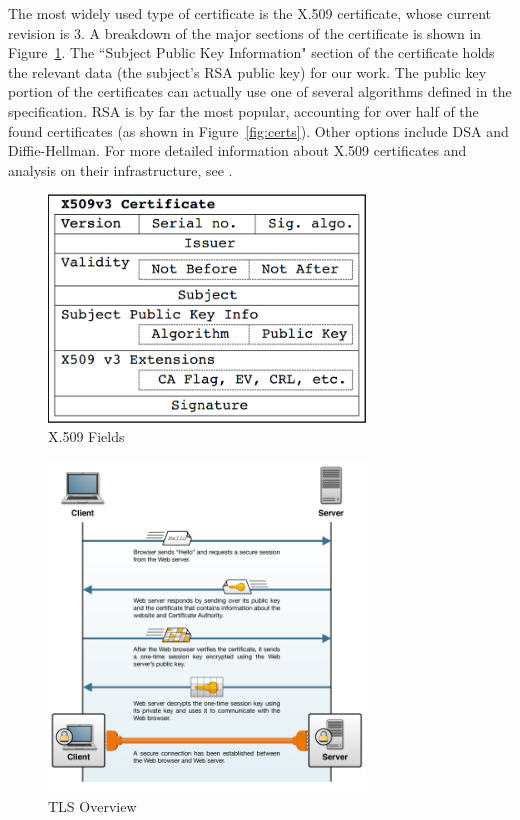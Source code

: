 \documentclass[12pt]{ucthesis}
\begin{document}
The most widely used type of certificate is the X.509 certificate, whose current
revision is 3. A breakdown of the major sections of the certificate is shown in
Figure~\ref{fig:x509}. The ``Subject Public Key Information" section of the
certificate holds the relevant data (the subject's RSA public key) for our work.
The public key portion of the certificates can actually use one of several
algorithms defined in the specification. RSA is by far the most popular,
accounting for over half of the found certificates (as shown in
Figure~\ref{fig:certs}). Other options include DSA and Diffie-Hellman. For more
detailed information about X.509 certificates and analysis on their
infrastructure, see \citet{holz2011ssl}.

\begin{figure}
   \centering
   \includegraphics[width=0.75\textwidth]{x509}
   \caption{X.509 Fields \citep{holz2011ssl}\label{fig:x509}}
\end{figure}

\begin{figure}
   \centering
   \includegraphics[width=0.75\textwidth]{tls}
   \caption{TLS Overview \citep{tlsconcepts}\label{fig:tls}}
\end{figure}
\end{document}

